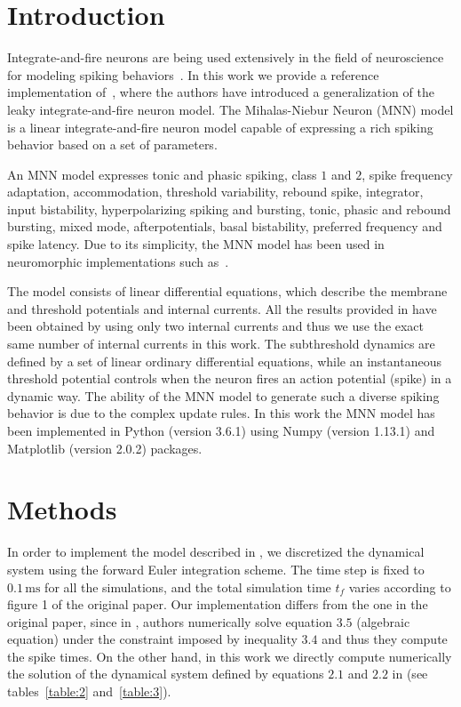 \documentclass[10pt,a4paper,onecolumn]{article}
\newcommand{\Rm}[1]{\mathrm{#1}}
\begin{document}
\section{Introduction}\label{introduction}

Integrate-and-fire neurons are being used extensively in the field of 
neuroscience for modeling spiking behaviors~\cite{dayan:2001}. In this work we
provide a reference implementation of~\cite{mihalas:2009}, where the authors
have introduced a generalization of the leaky integrate-and-fire neuron model. 
The Mihalas-Niebur Neuron (MNN) model is a linear integrate-and-fire neuron
model capable of expressing a rich spiking behavior based on a set of 
parameters.

An MNN model expresses tonic and phasic spiking, class $1$ and $2$, spike
frequency adaptation, accommodation, threshold variability, rebound spike,
integrator, input bistability, hyperpolarizing spiking and bursting, tonic,
phasic and rebound bursting, mixed mode, afterpotentials, basal bistability, 
preferred frequency and spike latency. 
Due to its simplicity, the MNN model has been used in neuromorphic 
implementations such as~\cite{folowosele:2011}. 

The model consists of linear differential equations, which describe the membrane
and threshold potentials and internal currents. All the results provided in 
\cite{mihalas:2009} have been obtained by using only two internal currents and
thus we use the exact same number of internal currents in this work. The
subthreshold dynamics are defined by a set of linear ordinary differential 
equations, while an instantaneous threshold potential controls when the neuron
fires an action potential (spike) in a dynamic way. The ability of the MNN 
model to generate 
such a diverse spiking behavior is due to the complex update rules. In this 
work the MNN model has been implemented in Python (version 3.6.1) using 
Numpy (version 1.13.1) and Matplotlib (version 2.0.2) packages. 



\section{Methods}\label{methods}

In order to implement the model described in \cite{mihalas:2009}, we discretized
the dynamical system using the forward Euler integration scheme. The time step
is fixed to $0.1\, \Rm{ms}$ for all the simulations, and the total simulation
time $t_f$ varies according to figure 1 of the original paper. Our
implementation differs from the one in the original paper, since in
\cite{mihalas:2009}, authors numerically solve equation $3.5$ (algebraic 
equation) under the constraint imposed by inequality $3.4$ and thus they
compute the spike times. On the other hand, in this work we directly compute
numerically the solution of the dynamical system defined by equations $2.1$
and $2.2$ in \cite{mihalas:2009} (see tables~\ref{table:2} and~\ref{table:3}). 
\end{document}
